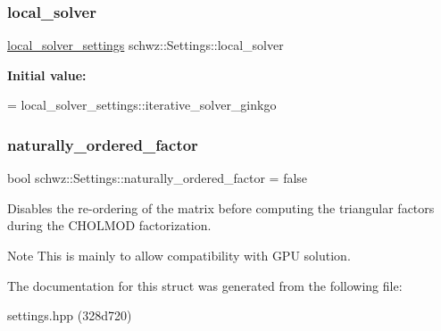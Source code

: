 \subsubsection{\texorpdfstring{local\+\_\+solver}{local\_solver}}
{\footnotesize\ttfamily \hyperlink{structschwz_1_1Settings_a31e82310ef6aed08168baef78f0db69e}{local\+\_\+solver\+\_\+settings} schwz\+::\+Settings\+::local\+\_\+solver}

{\bfseries Initial value\+:}
\begin{DoxyCode}
=
        local\_solver\_settings::iterative\_solver\_ginkgo
\end{DoxyCode}
\mbox{\label{structschwz_1_1Settings_a75a2ff3778c7334382a6c74553dbd5b4}} 
\subsubsection{\texorpdfstring{naturally\+\_\+ordered\+\_\+factor}{naturally\_ordered\_factor}}
{\footnotesize\ttfamily bool schwz\+::\+Settings\+::naturally\+\_\+ordered\+\_\+factor = false}



Disables the re-\/ordering of the matrix before computing the triangular factors during the C\+H\+O\+L\+M\+OD factorization. 

\begin{DoxyNote}{Note}
This is mainly to allow compatibility with G\+PU solution. 
\end{DoxyNote}


The documentation for this struct was generated from the following file\+:\begin{DoxyCompactItemize}
\item 
settings.\+hpp (328d720)\end{DoxyCompactItemize}
